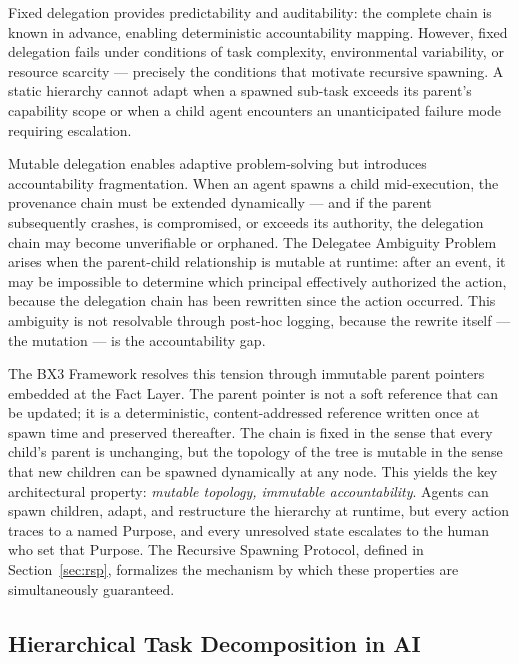 Fixed delegation provides predictability and auditability: the complete chain is known in advance, enabling deterministic accountability mapping. However, fixed delegation fails under conditions of task complexity, environmental variability, or resource scarcity --- precisely the conditions that motivate recursive spawning. A static hierarchy cannot adapt when a spawned sub-task exceeds its parent's capability scope or when a child agent encounters an unanticipated failure mode requiring escalation.

Mutable delegation enables adaptive problem-solving but introduces accountability fragmentation. When an agent spawns a child mid-execution, the provenance chain must be extended dynamically --- and if the parent subsequently crashes, is compromised, or exceeds its authority, the delegation chain may become unverifiable or orphaned. The Delegatee Ambiguity Problem arises when the parent-child relationship is mutable at runtime: after an event, it may be impossible to determine which principal effectively authorized the action, because the delegation chain has been rewritten since the action occurred. This ambiguity is not resolvable through post-hoc logging, because the rewrite itself --- the mutation --- is the accountability gap.

The BX3 Framework resolves this tension through immutable parent pointers embedded at the Fact Layer. The parent pointer is not a soft reference that can be updated; it is a deterministic, content-addressed reference written once at spawn time and preserved thereafter. The chain is fixed in the sense that every child's parent is unchanging, but the topology of the tree is mutable in the sense that new children can be spawned dynamically at any node. This yields the key architectural property: \emph{mutable topology, immutable accountability}. Agents can spawn children, adapt, and restructure the hierarchy at runtime, but every action traces to a named Purpose, and every unresolved state escalates to the human who set that Purpose. The Recursive Spawning Protocol, defined in Section~\ref{sec:rsp}, formalizes the mechanism by which these properties are simultaneously guaranteed.

\subsection{Hierarchical Task Decomposition in AI}

